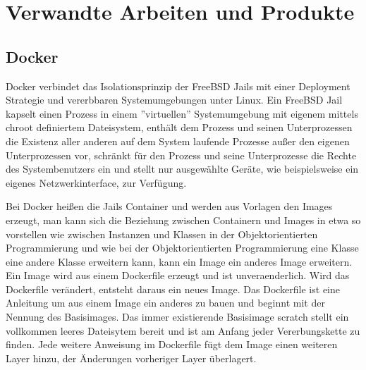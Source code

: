 \section{Verwandte Arbeiten und Produkte}
\label{sec:related-work}



\subsection{Docker}
Docker verbindet das Isolationsprinzip der FreeBSD Jails mit einer Deployment
Strategie und vererbbaren Systemumgebungen unter Linux.
Ein FreeBSD Jail kapselt einen Prozess in einem ''virtuellen'' Systemumgebung
mit eigenem mittels chroot definiertem Dateisystem, enthält dem Prozess und
seinen Unterprozessen die Existenz aller anderen auf dem System laufende
Prozesse außer den eigenen Unterprozessen vor, schränkt für den Prozess und
seine Unterprozesse die Rechte des Systembenutzers ein und stellt nur
ausgewählte Geräte, wie beispielsweise ein eigenes Netzwerkinterface, zur
Verfügung. \cite{FreeBSD-Jail-doc} \cite{FreeBSD-Jail-developer-comments} \cite{FreeBSD-Jail-paper}

Bei Docker heißen die Jails Container und werden aus Vorlagen den Images
erzeugt, man kann sich die Beziehung zwischen Containern und Images in etwa so
vorstellen wie zwischen Instanzen und Klassen in der Objektorientierten
Programmierung und wie bei der Objektorientierten Programmierung eine Klasse
eine andere Klasse erweitern kann, kann ein Image ein anderes Image erweitern.
Ein Image wird aus einem Dockerfile erzeugt und ist unveraenderlich. Wird das
Dockerfile verändert, entsteht daraus ein neues Image. Das Dockerfile ist eine
Anleitung um aus einem Image ein anderes zu bauen und beginnt mit der Nennung
des Basisimages. Das immer existierende Basisimage scratch stellt ein vollkommen
leeres Dateisytem bereit und ist am Anfang jeder Vererbungskette zu finden. Jede
weitere Anweisung im Dockerfile fügt dem Image einen weiteren Layer hinzu, der
Änderungen vorheriger Layer überlagert.


